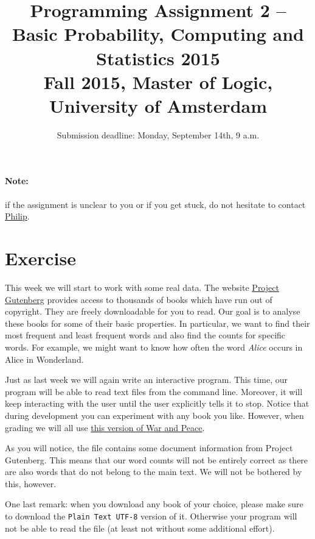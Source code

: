 \documentclass[11pt, leqno, a4paper]{article}
\title{Programming Assignment 2 -- Basic Probability, Computing and Statistics 2015 \\[2mm]
\large{Fall 2015, Master of Logic, University of Amsterdam}}
\author{}
\date{Submission deadline: Monday, September 14th, 9 a.m.}
\begin{document}
\maketitle

\paragraph{Note:} if the assignment is unclear to you or if you get stuck, do not hesitate to contact \href{mailto:P.Schulz@uva.nl}{Philip}.

\section{Exercise}
This week we will start to work with some real data. The website \href{https://www.gutenberg.org/}{Project Gutenberg} provides access to thousands of
books which have run out of copyright. They are freely downloadable for you to read. Our goal is to analyse these books for some of their basic 
properties. In particular, we want to find their most frequent and least frequent words and also find the counts for specific words. For example,
we might want to know how often the word \textit{Alice} occurs in Alice in Wonderland.

Just as last week we will again write an interactive program. This time, our program will be able to read text files from the command line. 
Moreover, it will keep interacting with the user until the user explicitly tells it to stop. Notice that during development you can experiment
with any book you like. However, when grading we will all use \href{https://www.gutenberg.org/cache/epub/2600/pg2600.txt}{this version of War and Peace}.

As you will notice, the file contains some document information from Project Gutenberg. This means that our word counts will not be entirely correct as
there are also words that do not belong to the main text. We will not be bothered by this, however.

One last remark: when you download any book of your choice, please make sure to download the \texttt{Plain Text UTF-8} version of it. Otherwise your
program will not be able to read the file (at least not without some additional effort).
\end{document}
